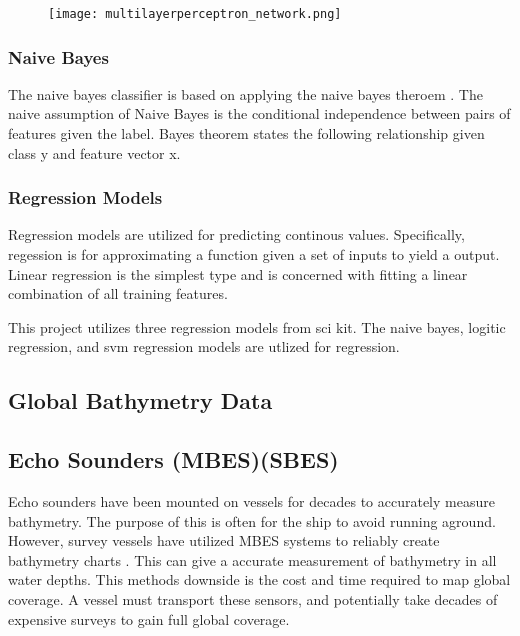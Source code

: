 \begin{figure}[]
    \centering
    \texttt{[image: multilayerperceptron\_network.png]}
    \caption{}
    \label{}
\end{figure}



\subsubsection{Naive Bayes}
The naive bayes classifier is based on applying the naive bayes theroem \cite{zhang2004optimality}.
The naive assumption of Naive Bayes is the conditional independence between pairs of features given the label.
Bayes theorem states the following relationship given class y and feature vector x.



\subsubsection{Regression Models}
Regression models are utilized for predicting continous values.
Specifically, regession is for approximating a function given a set of inputs to yield a output.
Linear regression is the simplest type and is concerned with fitting a linear combination of all training features.


This project utilizes three regression models from sci kit.
The naive bayes\cite{sklearn_api}, logitic regression\cite{sklearn_api}, and svm regression\cite{sklearn_api} models are utlized for regression.

\subsection{Global Bathymetry Data}

\subsection{Echo Sounders (\ac{MBES})(\ac{SBES}) }
Echo sounders have been mounted on vessels for decades to accurately measure bathymetry.
The purpose of this is often for the ship to avoid running aground.
However, survey vessels have utilized \ac{MBES} systems to reliably create bathymetry charts \cite{farr1980multibeam}.
This can give a accurate measurement of bathymetry in all water depths.
This methods downside is the cost and time required to map global coverage.
A vessel must transport these sensors, and potentially take decades of expensive surveys to gain full global coverage.

